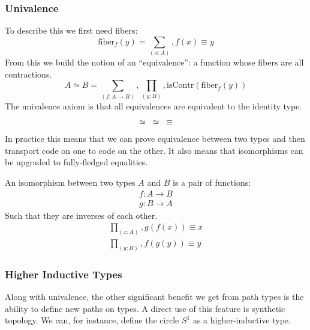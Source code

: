 \begin{subappendices}
\subsubsection{Univalence}
To describe this we first need fibers:
\begin{equation}
  \text{fiber}_f(y) = \sum_{(x : A)} , f (x) \equiv y
\end{equation}
From this we build the notion of an ``equivalence'': a function whose fibers are
all contractions.
\begin{equation}
  A \simeq B = \sum_{(f : A \rightarrow B)}, \prod_{(y : B)} , \text{isContr}(\text{fiber}_f(y))
\end{equation}
The univalence axiom is that all equivalences are equivalent to the identity
type.
\begin{definition}
  \begin{equation}
    \simeq \; \simeq \; \equiv
  \end{equation}
\end{definition}
In practice this means that we can prove equivalence between two types and then
transport code on one to code on the other.
It also means that isomorphisms can be upgraded to fully-fledged equalities.
\begin{definition}[Isomorphism]
  An isomorphism between two types \(A\) and \(B\) is a pair of functions:
  \begin{align}
    f : A \rightarrow B \\
    g : B \rightarrow A
  \end{align}
  Such that they are inverses of each other.
  \begin{align}
    \prod_{(x : A)} , g(f(x)) \equiv x \\
    \prod_{(y : B)} , f(g(y)) \equiv y
  \end{align}
\end{definition}
\subsubsection{Higher Inductive Types}
Along with univalence, the other significant benefit we get from path types is
the ability to define new paths on types.
A direct use of this feature is synthetic topology.
We can, for instance, define the circle \(S^1\) as a higher-inductive type.


\end{subappendices}
